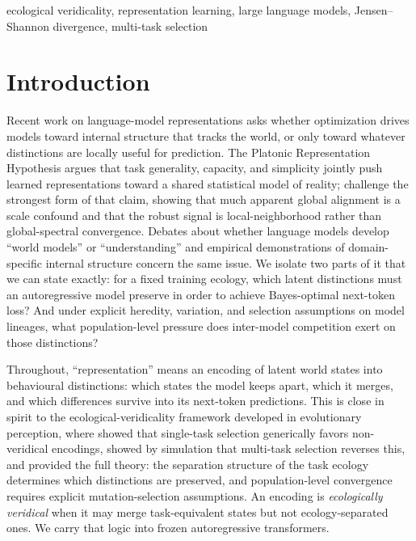 \documentclass[twoside,11pt]{article}
\begin{document}
\begin{keywords}
  ecological veridicality, representation learning, large language models,
  Jensen--Shannon divergence, multi-task selection
\end{keywords}

\section{Introduction}\label{sec:intro}

Recent work on language-model representations asks whether optimization drives models toward internal structure that tracks the world, or only toward whatever distinctions are locally useful for prediction. The Platonic Representation Hypothesis \citep{huh_etal_2024} argues that task generality, capacity, and simplicity jointly push learned representations toward a shared statistical model of reality; \citet{groeger_etal_2026} challenge the strongest form of that claim, showing that much apparent global alignment is a scale confound and that the robust signal is local-neighborhood rather than global-spectral convergence. Debates about whether language models develop ``world models'' or ``understanding'' \citep{bender_koller_2020,aguerayarcas_2022,mitchell_krakauer_2023,vandijk_etal_2023,cuskley_etal_2024,loru_etal_2025} and empirical demonstrations of domain-specific internal structure \citep{li_etal_2023,gurnee_tegmark_2024,nanda_etal_2023,taniguchi_etal_2025} concern the same issue. We isolate two parts of it that we can state exactly: for a fixed training ecology, which latent distinctions must an autoregressive model preserve in order to achieve Bayes-optimal next-token loss? And under explicit heredity, variation, and selection assumptions on model lineages, what population-level pressure does inter-model competition exert on those distinctions?

Throughout, ``representation'' means an encoding of latent world states into behavioural distinctions: which states the model keeps apart, which it merges, and which differences survive into its next-token predictions. This is close in spirit to the ecological-veridicality framework developed in evolutionary perception, where \citet{hoffman_etal_2015} showed that single-task selection generically favors non-veridical encodings, \citet{berke_etal_2022} showed by simulation that multi-task selection reverses this, and \citet{dallariva_2026} provided the full theory: the separation structure of the task ecology determines which distinctions are preserved, and population-level convergence requires explicit mutation-selection assumptions. An encoding is \emph{ecologically veridical} when it may merge task-equivalent states but not ecology-separated ones. We carry that logic into frozen autoregressive transformers.
\end{document}
